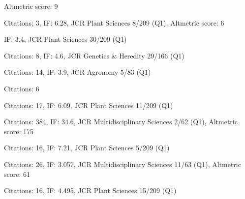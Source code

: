 \documentclass[]{friggeri-cv} %
\begin{document}
\cite{barash2016candidate}
\hspace{0.4cm} Altmetric score: 9

\cite{lee2016genome}
\hspace{0.4cm} Citations; 3, IF: 6.28, JCR Plant Sciences 8/209 (Q1), Altmetric score: 6

\cite{bayer2016genomics}

\cite{visendi2016efficient}
\hspace{0.4cm} IF: 3.4, JCR Plant Sciences 30/209 (Q1)

\cite{mason2016centromere}
\hspace{0.4cm} Citations: 8, IF: 4.6, JCR Genetics \& Heredity 29/166 (Q1)

\cite{bayer2016skim}

\cite{bayer2015high}
\hspace{0.4cm} Citations: 14, IF: 3.9, JCR Agronomy 5/83 (Q1)
 
\cite{golicz2015skim}
\hspace{0.4cm} Citations: 6

\cite{lai2015identification}
\hspace{0.4cm} Citations: 17,  IF: 6.09, JCR Plant Sciences 11/209 (Q1)

\cite{chalhoub2014early}
\hspace{0.4cm} Citations: 384, IF: 34.6, JCR Multidisciplinary Sciences 2/62 (Q1), Altmetric score: 175

\cite{mason2014high}
\hspace{0.4cm} Citations: 16, IF: 7.21, JCR Plant Sciences 5/209 (Q1)

\cite{greshake2014opensnp}
\hspace{0.4cm} Citations: 26, IF: 3.057, JCR Multidisciplinary Sciences 11/63 (Q1), Altmetric score: 61

\cite{dattolo2013acclimation}
\hspace{0.4cm} Citations: 16, IF: 4.495, JCR Plant Sciences 15/209 (Q1)



\end{document}

